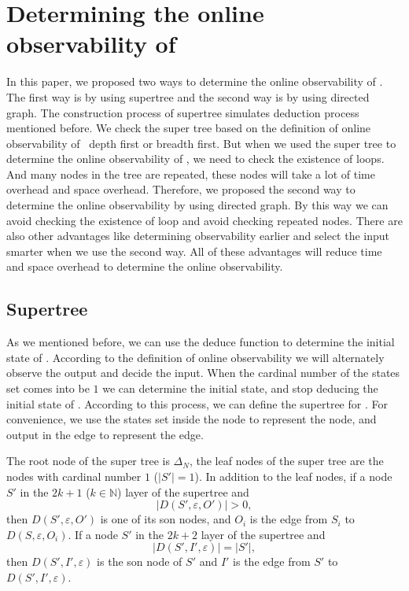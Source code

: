 \section{Determining the online observability of \BCNs}
\label{sec:deter}
In this paper, we proposed two ways to determine the online observability of \BCNs. The first way is by using supertree and the second way is by using directed graph. The construction process of supertree simulates deduction process mentioned before. We check the super tree based on the definition of online observability of \BCNs\ depth first or breadth first. But when we used the super tree to determine the online observability of \BCNs, we need to check the existence of loops. And many nodes in the tree are repeated, these nodes will take a lot of time overhead and space overhead. Therefore, we proposed the second way to determine the online observability by using directed graph. By this way we can avoid checking the existence of loop and avoid checking repeated nodes. There are also other advantages like determining observability earlier and select the input smarter when we use the second way. All of these advantages will reduce time and space overhead to determine the online observability.   

\subsection{Supertree} As we mentioned before, we can use the deduce function to determine the initial state of \BCNs. According to the definition of online observability we will alternately observe the output and decide the input. When the  cardinal number of the states set comes into be $1$ we can determine the initial state, and stop deducing the initial state of \BCNs. According to this process, we can define the supertree for \BCNs. For convenience, we use the states set inside the node to represent the node, and output in the edge to represent the edge.
\begin{definition}
The root node of the super tree is $\Delta_N$, the leaf nodes of the super tree are the nodes with cardinal number $1$ ($|S'|=1$). In addition to the leaf nodes, if a node $S'$ in the $2k + 1$ ($k\in \mathbb{N}$) layer of the supertree and 
\[|D\left(S',\varepsilon, O'\right)|>0,\]
 then $D\left(S',\varepsilon, O'\right)$ is one of its son nodes, and $O_i$ is the edge from $S_i$ to $D\left(S,\varepsilon, O_i\right)$. If a node $S'$ in the $2k+2$ layer of the supertree and  
\[|D\left(S',I',\varepsilon\right)|=|S'|,\] 
then $D\left(S',I',\varepsilon\right)$ is the son node of $S'$ and $I'$ is the edge from $S'$ to $D\left(S',I',\varepsilon\right)$. 
\end{definition}

